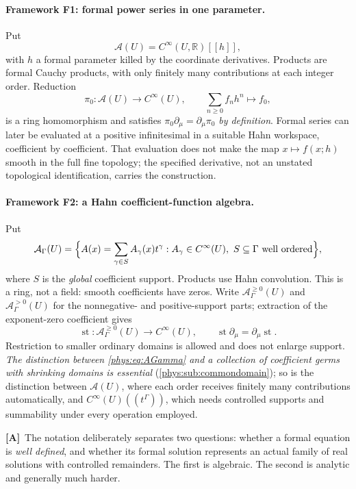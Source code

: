 \documentclass[11pt,letterpaper]{article}
\numberwithin{equation}{section}
\theoremstyle{definition}
\theoremstyle{remark}
\newcommand{\R}{\mathbb R}
\newcommand{\Alg}{\mathcal A}
\DeclareMathOperator{\st}{st}
\newcommand{\TA}{\textcolor{TierA}{\textsf{\bfseries[A]}}}
\begin{document}
\paragraph{Framework F1: formal power series in one parameter.}
Put
\begin{equation}\label{phys:eq:AU}
\Alg(U)=C^{\infty}(U,\R)[[h]],
\end{equation}
with $h$ a formal parameter killed by the coordinate derivatives. Products are
formal Cauchy products, with only finitely many contributions at each integer
order. Reduction
\[
\pi_{0}:\Alg(U)\to C^{\infty}(U),
\qquad \sum_{n\ge0}f_{n}h^{n}\mapsto f_{0},
\]
is a ring homomorphism and satisfies $\pi_{0}\partial_{\mu}=\partial_{\mu}\pi_{0}$
\emph{by definition}. Formal series can later be evaluated at a positive
infinitesimal in a suitable Hahn workspace, coefficient by coefficient. That
evaluation does not make the map $x\mapsto f(x;h)$ smooth in the full fine
topology; the specified derivative, not an unstated topological
identification, carries the construction.

\paragraph{Framework F2: a Hahn coefficient-function algebra.}
Put
\begin{equation}\label{phys:eq:AGamma}
\Alg_{\Gamma}(U)=\Bigl\{A(x)=\sum_{\gamma\in S}A_{\gamma}(x)t^{\gamma}
: A_{\gamma}\in C^{\infty}(U),\ S\subseteq\Gamma\ \text{well ordered}\Bigr\},
\end{equation}
where $S$ is the \emph{global} coefficient support. Products use Hahn
convolution. This is a ring, not a field: smooth coefficients have zeros.
Write $\Alg^{\ge0}_{\Gamma}(U)$ and $\Alg^{>0}_{\Gamma}(U)$ for the
nonnegative- and positive-support parts; extraction of the exponent-zero
coefficient gives
\[
\st:\Alg^{\ge0}_{\Gamma}(U)\to C^{\infty}(U),
\qquad \st\partial_{\mu}=\partial_{\mu}\st.
\]
Restriction to smaller ordinary domains is allowed and does not enlarge
support. \emph{The distinction between \eqref{phys:eq:AGamma} and a collection
of coefficient germs with shrinking domains is essential}
(\cref{phys:sub:commondomain}); so is the distinction between $\Alg(U)$, where
each order receives finitely many contributions automatically, and
$C^{\infty}(U)((t^{\Gamma}))$, which needs controlled supports and summability
under every operation employed.

\TA\ The notation deliberately separates two questions: whether a formal
equation is \emph{well defined}, and whether its formal solution represents an
actual family of real solutions with controlled remainders. The first is
algebraic. The second is analytic and generally much harder.
\end{document}
